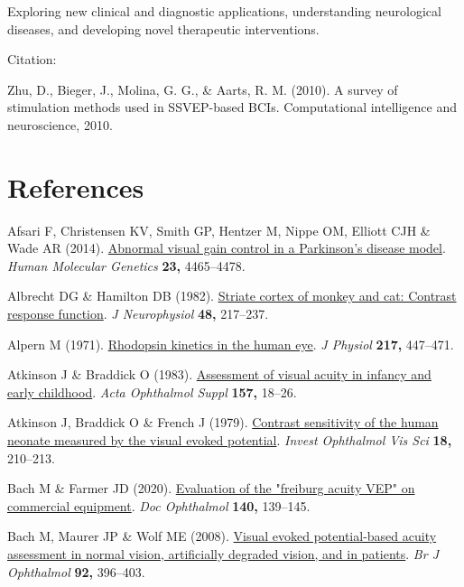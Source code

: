 \documentclass[
  letterpaper,
  DIV=11,
  numbers=noendperiod]{scrartcl}
\newlength{\cslhangindent}
\newenvironment{CSLReferences}[2] %
 {\begin{list}{}{%
  \setlength{\itemindent}{0pt}
  \setlength{\leftmargin}{0pt}
  \setlength{\parsep}{0pt}
  \ifodd #1
   \setlength{\leftmargin}{\cslhangindent}
   \setlength{\itemindent}{-1\cslhangindent}
  \fi
  \setlength{\itemsep}{#2\baselineskip}}}
 {\end{list}}
\begin{document}
Exploring new clinical and diagnostic applications, understanding
neurological diseases, and developing novel therapeutic interventions.

Citation:

Zhu, D., Bieger, J., Molina, G. G., \& Aarts, R. M. (2010). A survey of
stimulation methods used in SSVEP-based BCIs. Computational intelligence
and neuroscience, 2010.

\section*{References}\label{references}

\label{refs}
\begin{CSLReferences}{1}{1}
Afsari F, Christensen KV, Smith GP, Hentzer M, Nippe OM, Elliott CJH \&
Wade AR (2014). \href{https://doi.org/10.1093/hmg/ddu159}{Abnormal
visual gain control in a {Parkinson}'s disease model}. \emph{Human
Molecular Genetics} \textbf{23,} 4465--4478.

Albrecht DG \& Hamilton DB (1982).
\href{https://doi.org/10.1152/jn.1982.48.1.217}{Striate cortex of monkey
and cat: Contrast response function}. \emph{J Neurophysiol} \textbf{48,}
217--237.

Alpern M (1971).
\href{https://doi.org/10.1113/jphysiol.1971.sp009580}{Rhodopsin kinetics
in the human eye}. \emph{J Physiol} \textbf{217,} 447--471.

Atkinson J \& Braddick O (1983).
\href{https://doi.org/10.1111/j.1755-3768.1983.tb03927.x}{Assessment of
visual acuity in infancy and early childhood}. \emph{Acta Ophthalmol
Suppl} \textbf{157,} 18--26.

Atkinson J, Braddick O \& French J (1979).
\href{https://www.ncbi.nlm.nih.gov/pubmed/761974}{Contrast sensitivity
of the human neonate measured by the visual evoked potential}.
\emph{Invest Ophthalmol Vis Sci} \textbf{18,} 210--213.

Bach M \& Farmer JD (2020).
\href{https://doi.org/10.1007/s10633-019-09726-2}{Evaluation of the
"freiburg acuity VEP" on commercial equipment}. \emph{Doc Ophthalmol}
\textbf{140,} 139--145.

Bach M, Maurer JP \& Wolf ME (2008).
\href{https://doi.org/10.1136/bjo.2007.130245}{Visual evoked
potential-based acuity assessment in normal vision, artificially
degraded vision, and in patients}. \emph{Br J Ophthalmol} \textbf{92,}
396--403.


\end{CSLReferences}
\end{document}
